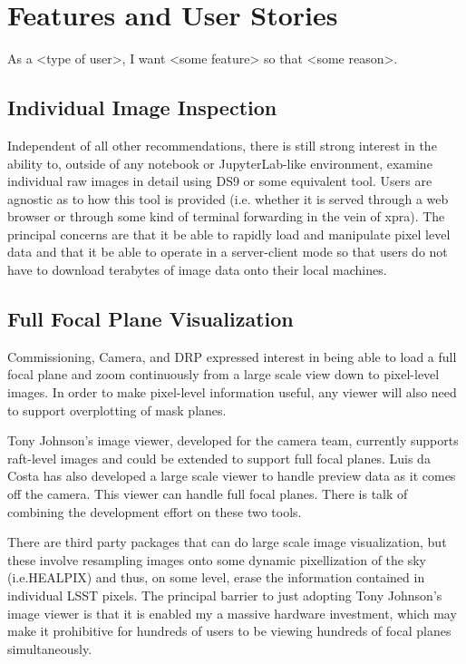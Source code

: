 \section{Features and User Stories}
\label{sec:features}

As a <type of user>, I want <some feature> so that <some reason>. 

\subsection{Individual Image Inspection}

Independent of all other recommendations, there is still strong interest in the
ability to, outside of any notebook or JupyterLab-like environment, examine
individual raw images in detail using DS9 or some equivalent tool.  Users are
agnostic as to how this tool is provided (i.e. whether it is served through a
web browser or through some kind of terminal forwarding in the vein of xpra). 
The principal concerns are that it be able to rapidly load and manipulate pixel
level data and that it be able to operate in a server-client mode so that users
do not have to download terabytes of image data onto their local machines.

\subsection{Full Focal Plane Visualization}

Commissioning, Camera, and DRP expressed interest in being able to load a full focal plane and zoom continuously
from a large scale view down to pixel-level images.  In order to make pixel-level information useful, any
viewer will also need to support overplotting of mask planes.

Tony Johnson's image viewer, developed for the camera team, currently supports raft-level images and could be
extended to support full focal planes.  Luis da Costa has also developed a large scale viewer to handle preview
data as it comes off the camera.  This viewer can handle full focal planes.  There is talk of combining the
development effort on these two tools.

There are third party packages that can do large scale image
visualization, but these involve resampling images onto some dynamic pixellization of the sky (i.e.HEALPIX) and
thus, on some level, erase the information contained in individual LSST pixels.  The principal barrier to just
adopting Tony Johnson's image viewer is that it is enabled my a massive hardware investment, which may make it
prohibitive for hundreds of users to be viewing hundreds of focal planes simultaneously.

